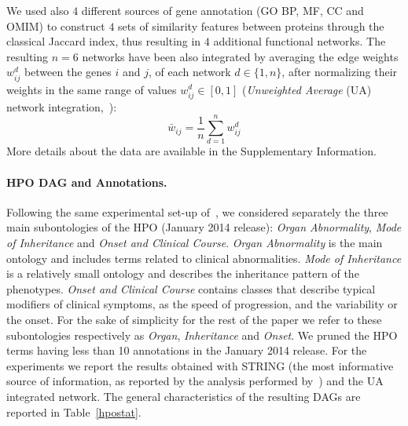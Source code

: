 \documentclass{bioinfo}
\begin{document}
We used also $4$ different sources of gene annotation (GO BP, MF, CC and OMIM) to construct $4$ sets of similarity features between proteins through the classical Jaccard index, thus resulting in $4$ additional functional networks.
The resulting $n=6$ networks have been also integrated by averaging the  edge weights $w^d_{ij}$  between the genes $i$ and $j$, of each network $d \in \{1, n\}$, after normalizing their weights in the same range of values $w^d_{ij} \in [0,1]$ ({\it Unweighted Average} (UA) network integration,~\citet{Vale14e}):
\begin{equation}
\bar{w}_{ij} = \frac{1}{n} \sum_{d = 1}^n w_{ij}^d
\label{eq:UA}
\end{equation}
More details about the data are available in the Supplementary Information.

\paragraph{HPO DAG and Annotations.}
\label{hpo}
Following the same experimental set-up of~\citet{PHENO15}, we considered separately the three main subontologies of the HPO (January 2014 release): {\it Organ Abnormality}, {\it Mode of Inheritance} and {\it Onset and Clinical Course}.
{\it Organ Abnormality} is the main ontology and includes terms related to clinical abnormalities. {\it  Mode of Inheritance} is a relatively small ontology and describes the inheritance pattern of the phenotypes. {\it Onset and Clinical Course} contains classes that describe typical modifiers of clinical symptoms, as the speed of progression, and the variability or the onset. 
For the sake of simplicity for the rest of the paper we refer to these subontologies respectively as {\it Organ}, {\it Inheritance} and {\it Onset}.
We pruned the HPO terms having less than 10 annotations in the January 2014 release. For the experiments we report the results obtained with STRING (the  most informative source of information, as reported by the analysis performed by~\citet{PHENO15}) and the UA integrated network.
The general characteristics of the resulting DAGs are reported in  Table~\ref{hpostat}.
\end{document}
